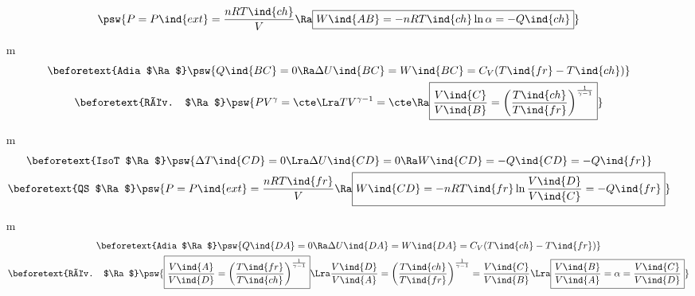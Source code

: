\documentclass[../../main/main.tex]{subfiles}
\begin{document}
\begin{tcb*}[breakable]
\begin{enumerate}[label=\sqenumi]
\begin{gather*}
        \psw{%
                  P = P\ind{ext} = \frac{nRT\ind{ch}}{V}
                \Ra 
                \boxed{W\ind{AB} = -nRT\ind{ch}\ln \alpha = -Q\ind{ch}}
        }%
      \end{gather*}
      \vspace{\fill}
    \item[m]
      \begin{gather*}
        \beforetext{Adia $\Ra$}
        \psw{%
                  Q\ind{BC} = 0
                \Ra 
                \Delta{U}\ind{BC} = W\ind{BC} = C_V (T\ind{fr} - T\ind{ch})
        }%
        \\\beforetext{Rév. $\Ra$}
        \psw{%
                  PV^{\gamma} = \cte
                \Lra
                TV^{\gamma-1} = \cte
                \Ra 
                \boxed{\frac{V\ind{C}}{V\ind{B}} =
                \left( \frac{T\ind{ch}}{T\ind{fr}} \right)^{\frac{1}{\gamma-1}}}
        }%
      \end{gather*}
      \pagebreak
    \item[m]
      \begin{gather*}
        \beforetext{IsoT $\Ra$}
        \psw{%
                  \Delta{T}\ind{CD} = 0
                \Lra
                \Delta{U}\ind{CD} = 0
                \Ra
                W\ind{CD} = - Q\ind{CD} = -Q\ind{fr}
        }%
        \\\beforetext{QS $\Ra$}
        \psw{%
                  P = P\ind{ext} = \frac{nRT\ind{fr}}{V}
                \Ra 
                \boxed{W\ind{CD} = -nRT\ind{fr}\ln \frac{V\ind{D}}{V\ind{C}} = -Q\ind{fr}}
        }%
      \end{gather*}
    \item[m]
      \begin{gather*}
        \beforetext{Adia $\Ra$}
        \psw{%
                  Q\ind{DA} = 0
                \Ra 
                \Delta{U}\ind{DA} = W\ind{DA} = C_V (T\ind{ch} - T\ind{fr})
        }%
        \\\beforetext{Rév. $\Ra$}
        \psw{%
                  \boxed{\frac{V\ind{A}}{V\ind{D}} =
                \left( \frac{T\ind{fr}}{T\ind{ch}} \right)^{\frac{1}{\gamma-1}}}
                \Lra
                \frac{V\ind{D}}{V\ind{A}} =
                \left( \frac{T\ind{ch}}{T\ind{fr}} \right)^{\frac{1}{\gamma-1}} =
                \frac{V\ind{C}}{V\ind{B}}
                \Lra
                \boxed{\frac{V\ind{B}}{V\ind{A}} = \alpha = \frac{V\ind{C}}{V\ind{D}}}
        }%

\end{gather*}
\end{enumerate}
\end{tcb*}
\end{document}
